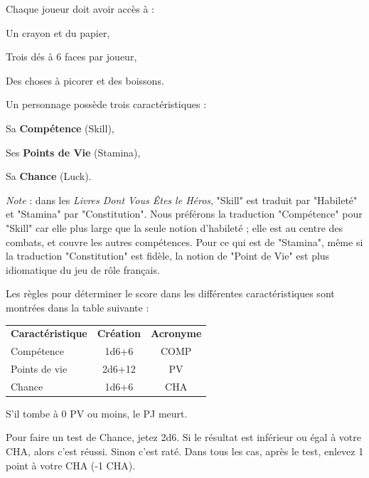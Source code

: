 \begin{frame}[b]
{

\myindent Chaque joueur doit avoir accès à :
\begin{myitemize}
\item Un crayon et du papier,
\item Trois dés à 6 faces par joueur,
\item Des choses à picorer et des boissons.
\end{myitemize}



\myindent Un personnage possède trois caractéristiques :
\begin{myitemize}
\item Sa \textbf{Compétence} (Skill),
\item Ses \textbf{Points de Vie} (Stamina),
\item Sa \textbf{Chance} (Luck).
\end{myitemize}

\textit{Note} : dans les \textit{Livres Dont Vous Êtes le Héros}, "Skill" est traduit par "Habileté" et "Stamina" par "Constitution". Nous préférons la traduction "Compétence" pour "Skill" car elle plus large que la seule notion d'habileté ; elle est au centre des combats, et couvre les autres compétences. Pour ce qui est de "Stamina", même si la traduction "Constitution" est fidèle, la notion de "Point de Vie" est plus idiomatique du jeu de rôle français.

\myindent Les règles pour déterminer le score dans les différentes caractéristiques sont montrées dans la table suivante :

\begin{center}
\begin{tabular}{lcc}
\textbf{Caractéristique} & \textbf{Création} & \textbf{Acronyme} \\
Compétence        &      1d6+6 & COMP       \\
Points de vie     &     2d6+12 & PV         \\
Chance            &      1d6+6 & CHA        \\
\end{tabular}
\end{center}

\myindent S'il tombe à 0 PV ou moins, le PJ meurt.


\myindent Pour faire un test de Chance, jetez 2d6. Si le résultat est inférieur ou égal à votre CHA, alors c'est réussi. Sinon c'est raté. Dans tous les cas, après le test, enlevez 1 point à votre CHA (-1 CHA).

}
\end{frame}
